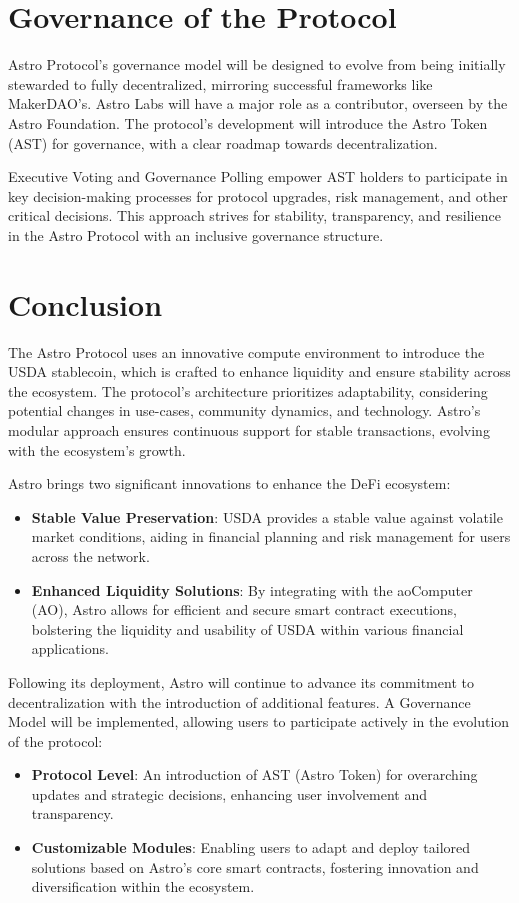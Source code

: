 \section{Governance of the Protocol}
Astro Protocol’s governance model will be designed to evolve from being initially stewarded to fully decentralized, mirroring successful frameworks like MakerDAO’s. Astro Labs will have a major role as a contributor, overseen by the Astro Foundation. The protocol's development will introduce the Astro Token (AST) for governance, with a clear roadmap towards decentralization.

Executive Voting and Governance Polling empower AST holders to participate in key decision-making processes for protocol upgrades, risk management, and other critical decisions. This approach strives for stability, transparency, and resilience in the Astro Protocol with an inclusive governance structure.

\section{Conclusion}
The Astro Protocol uses an innovative compute environment to introduce the USDA stablecoin, which is crafted to enhance liquidity and ensure stability across the ecosystem. The protocol's architecture prioritizes adaptability, considering potential changes in use-cases, community dynamics, and technology. Astro’s modular approach ensures continuous support for stable transactions, evolving with the ecosystem’s growth.

Astro brings two significant innovations to enhance the DeFi ecosystem:
\begin{itemize}
    \item \textbf{Stable Value Preservation}: USDA provides a stable value against volatile market conditions, aiding in financial planning and risk management for users across the network.
    \item \textbf{Enhanced Liquidity Solutions}: By integrating with the aoComputer (AO), Astro allows for efficient and secure smart contract executions, bolstering the liquidity and usability of USDA within various financial applications.
\end{itemize}

Following its deployment, Astro will continue to advance its commitment to decentralization with the introduction of additional features. A Governance Model will be implemented, allowing users to participate actively in the evolution of the protocol:
\begin{itemize}
    \item \textbf{Protocol Level}: An introduction of AST (Astro Token) for overarching updates and strategic decisions, enhancing user involvement and transparency.
    \item \textbf{Customizable Modules}: Enabling users to adapt and deploy tailored solutions based on Astro’s core smart contracts, fostering innovation and diversification within the ecosystem.
\end{itemize}

